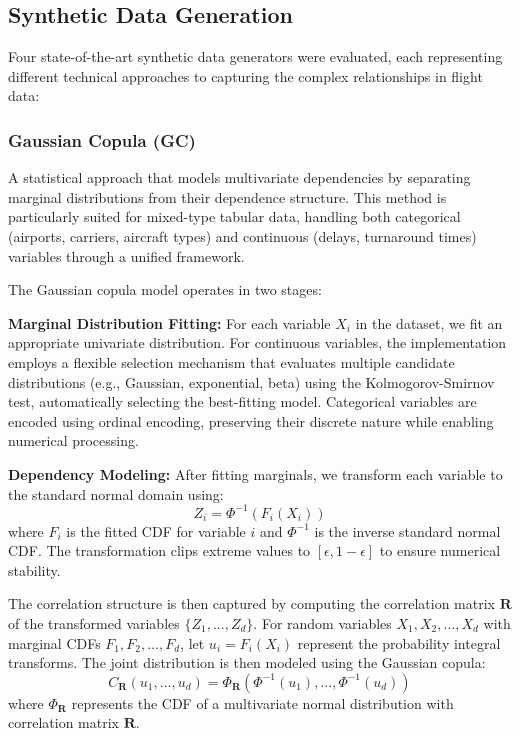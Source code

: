 \documentclass[conference]{IEEEtran}
\begin{document}
\subsection{Synthetic Data Generation}
Four state-of-the-art synthetic data generators were evaluated, each representing different technical approaches to capturing the complex relationships in flight data:

\subsubsection{Gaussian Copula (GC)}
A statistical approach that models multivariate dependencies by separating marginal distributions from their dependence structure. This method is particularly suited for mixed-type tabular data, handling both categorical (airports, carriers, aircraft types) and continuous (delays, turnaround times) variables through a unified framework.

The Gaussian copula model operates in two stages:

\textbf{Marginal Distribution Fitting:} For each variable $X_i$ in the dataset, we fit an appropriate univariate distribution. For continuous variables, the implementation employs a flexible selection mechanism that evaluates multiple candidate distributions (e.g., Gaussian, exponential, beta) using the Kolmogorov-Smirnov test, automatically selecting the best-fitting model. Categorical variables are encoded using ordinal encoding, preserving their discrete nature while enabling numerical processing.

\textbf{Dependency Modeling:} After fitting marginals, we transform each variable to the standard normal domain using:
\begin{equation}
Z_i = \Phi^{-1}(F_i(X_i))
\end{equation}
where $F_i$ is the fitted CDF for variable $i$ and $\Phi^{-1}$ is the inverse standard normal CDF. The transformation clips extreme values to $[\epsilon, 1-\epsilon]$ to ensure numerical stability.

The correlation structure is then captured by computing the correlation matrix $\mathbf{R}$ of the transformed variables $\{Z_1, ..., Z_d\}$. For random variables $X_1, X_2, \ldots, X_d$ with marginal CDFs $F_1, F_2, \ldots, F_d$, let $u_i = F_i(X_i)$ represent the probability integral transforms. The joint distribution is then modeled using the Gaussian copula:
\begin{equation}
C_{\mathbf{R}}(u_1, ..., u_d) = \Phi_{\mathbf{R}}(\Phi^{-1}(u_1), ..., \Phi^{-1}(u_d))
\end{equation}
where $\Phi_{\mathbf{R}}$ represents the CDF of a multivariate normal distribution with correlation matrix $\mathbf{R}$.
\end{document}
